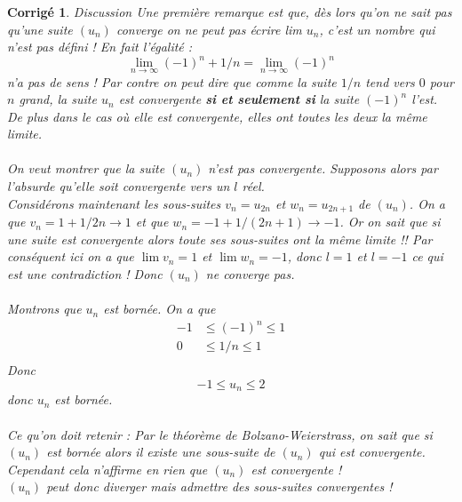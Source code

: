 \documentclass[11pt,french,table]{article}
\theoremstyle{exercice}
\theoremstyle{corrigé}
\newtheorem{corrigé}{Corrigé}
\begin{document}
\begin{corrigé}
\vspace{1em}
\textit{Discussion} Une première remarque est que, dès lors qu'on ne sait pas qu'une suite $(u_n)$ converge on ne peut pas écrire lim $u_n$, c'est un nombre qui n'est pas défini ! En fait l'égalité : 
\begin{equation*}
    \lim\limits_{n\to \infty}{(-1)^n+1/n}=\lim\limits_{n\to \infty}{(-1)^n}
\end{equation*}
n'a pas de sens ! Par contre on peut dire que comme la suite $1/n$ tend vers $0$ pour $n$ grand, la suite $u_n$ est convergente \textbf{si et seulement si} la suite $(-1)^n$ l'est. De plus dans le cas où elle est convergente, elles ont toutes les deux la même limite. \paragraph{}
On veut montrer que la suite $(u_n)$ n'est pas convergente. Supposons alors par l'absurde qu'elle soit convergente vers un $l$ réel. \\
Considérons maintenant les sous-suites $v_n=u_{2n}$ et $w_n=u_{2n+1}$ de $(u_n)$. On a que $v_n=1+1/2n\to 1$ et que $w_n = -1+1/(2n+1)\to -1$. Or on sait que si une suite est convergente alors toute ses sous-suites ont la même limite !! 
Par conséquent ici on a que $\lim v_n=1$ et $\lim w_n=-1$, donc $l=1$ et $l=-1$ ce qui est une contradiction ! Donc $(u_n)$ ne converge pas. 
\paragraph{}
Montrons que $u_n$ est bornée. On a que 
\begin{equation*}
    \begin{aligned}
        -1 &\leq (-1)^n\leq 1 \\
        0 & \leq 1/n \leq 1 \\
    \end{aligned}
    \end{equation*}
    Donc 
    \begin{equation*}
                -1 \leq u_n \leq 2
    \end{equation*}
donc $u_n$ est bornée. 
\paragraph{}
Ce qu'on doit retenir : Par le théorème de Bolzano-Weierstrass, on sait que si $(u_n)$ est bornée alors il existe une sous-suite de $(u_n)$ qui est convergente. Cependant cela n'affirme en rien que $(u_n)$ est convergente ! \\ 
$(u_n)$ peut donc diverger mais admettre des sous-suites convergentes ! 
\end{corrigé}
\end{document}
